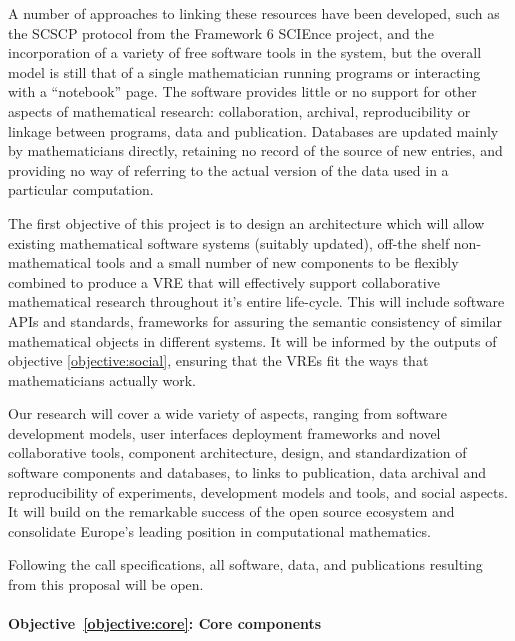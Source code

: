 \documentclass[noworkareas,deliverables,keys]{euproposal}                  %
\begin{document}
\begin{proposal}
A number of approaches to linking these resources have been developed,
such as the SCSCP protocol from the Framework 6 SCIEnce project, and
the incorporation of a variety of free software tools in the \Sage 
system, but the overall model is still that of a single mathematician
running programs or interacting with a ``notebook''
page. The software provides little or no support for other aspects of
mathematical research: collaboration,
archival, reproducibility or linkage between programs, data and
publication. Databases are updated mainly by mathematicians directly,
retaining no record of the source of new entries, and providing no way
of referring to the actual version of the data used in a particular
computation.

The first objective of this project is to design an architecture which
will allow existing mathematical software systems (suitably updated), 
off-the shelf non-mathematical tools and a small number of new
components to be flexibly combined to produce a VRE that will
effectively support collaborative mathematical research throughout
it's entire life-cycle. This will include software APIs and standards,
frameworks for assuring the semantic consistency of similar
mathematical objects in different systems.  It will be informed by the
outputs of objective \ref{objective:social}, ensuring that the VREs
fit the ways that mathematicians actually work.


Our research will cover a wide variety of aspects, ranging from
software development models, user interfaces   deployment frameworks and novel collaborative tools,
component architecture, design, and standardization of software
components and databases, to links to publication, data archival and
reproducibility of experiments, development models and tools, and
social aspects. It will build on the remarkable success of the open
source ecosystem and consolidate Europe's leading position in
computational mathematics.

Following the call specifications, all software, data, and
publications resulting from this proposal will be open.



\paragraph{Objective~\ref{objective:core}: Core components}\


\end{proposal}
\end{document}
